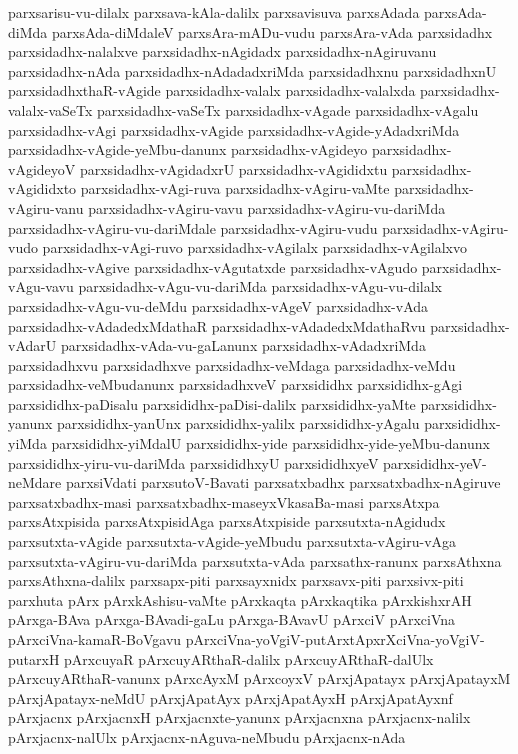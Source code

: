 {parxsarisu-vu-dilalx
parxsava-kAla-dalilx
parxsavisuva
parxsAdada
parxsAda-diMda
parxsAda-diMdaleV
parxsAra-mADu-vudu
parxsAra-vAda
parxsidadhx
parxsidadhx-nalalxve
parxsidadhx-nAgidadx
parxsidadhx-nAgiruvanu
parxsidadhx-nAda
parxsidadhx-nAdadadxriMda
parxsidadhxnu
parxsidadhxnU
parxsidadhxthaR-vAgide
parxsidadhx-valalx
parxsidadhx-valalxda
parxsidadhx-valalx-vaSeTx
parxsidadhx-vaSeTx
parxsidadhx-vAgade
parxsidadhx-vAgalu
parxsidadhx-vAgi
parxsidadhx-vAgide
parxsidadhx-vAgide-yAdadxriMda
parxsidadhx-vAgide-yeMbu-danunx
parxsidadhx-vAgideyo
parxsidadhx-vAgideyoV
parxsidadhx-vAgidadxrU
parxsidadhx-vAgididxtu
parxsidadhx-vAgididxto
parxsidadhx-vAgi-ruva
parxsidadhx-vAgiru-vaMte
parxsidadhx-vAgiru-vanu
parxsidadhx-vAgiru-vavu
parxsidadhx-vAgiru-vu-dariMda
parxsidadhx-vAgiru-vu-dariMdale
parxsidadhx-vAgiru-vudu
parxsidadhx-vAgiru-vudo
parxsidadhx-vAgi-ruvo
parxsidadhx-vAgilalx
parxsidadhx-vAgilalxvo
parxsidadhx-vAgive
parxsidadhx-vAgutatxde
parxsidadhx-vAgudo
parxsidadhx-vAgu-vavu
parxsidadhx-vAgu-vu-dariMda
parxsidadhx-vAgu-vu-dilalx
parxsidadhx-vAgu-vu-deMdu
parxsidadhx-vAgeV
parxsidadhx-vAda
parxsidadhx-vAdadedxMdathaR
parxsidadhx-vAdadedxMdathaRvu
parxsidadhx-vAdarU
parxsidadhx-vAda-vu-gaLanunx
parxsidadhx-vAdadxriMda
parxsidadhxvu
parxsidadhxve
parxsidadhx-veMdaga
parxsidadhx-veMdu
parxsidadhx-veMbudanunx
parxsidadhxveV
parxsididhx
parxsididhx-gAgi
parxsididhx-paDisalu
parxsididhx-paDisi-dalilx
parxsididhx-yaMte
parxsididhx-yanunx
parxsididhx-yanUnx
parxsididhx-yalilx
parxsididhx-yAgalu
parxsididhx-yiMda
parxsididhx-yiMdalU
parxsididhx-yide
parxsididhx-yide-yeMbu-danunx
parxsididhx-yiru-vu-dariMda
parxsididhxyU
parxsididhxyeV
parxsididhx-yeV-neMdare
parxsiVdati
parxsutoV-Bavati
parxsatxbadhx
parxsatxbadhx-nAgiruve
parxsatxbadhx-masi
parxsatxbadhx-maseyxVkasaBa-masi
parxsAtxpa
parxsAtxpisida
parxsAtxpisidAga
parxsAtxpiside
parxsutxta-nAgidudx
parxsutxta-vAgide
parxsutxta-vAgide-yeMbudu
parxsutxta-vAgiru-vAga
parxsutxta-vAgiru-vu-dariMda
parxsutxta-vAda
parxsathx-ranunx
parxsAthxna
parxsAthxna-dalilx
parxsapx-piti
parxsayxnidx
parxsavx-piti
parxsivx-piti
parxhuta
pArx
pArxkAshisu-vaMte
pArxkaqta
pArxkaqtika
pArxkishxrAH
pArxga-BAva
pArxga-BAvadi-gaLu
pArxga-BAvavU
pArxciV
pArxciVna
pArxciVna-kamaR-BoVgavu
pArxciVna-yoVgiV-putArxtApxrXciVna-yoVgiV-putarxH
pArxcuyaR
pArxcuyARthaR-dalilx
pArxcuyARthaR-dalUlx
pArxcuyARthaR-vanunx
pArxcAyxM
pArxcoyxV
pArxjApatayx
pArxjApatayxM
pArxjApatayx-neMdU
pArxjApatAyx
pArxjApatAyxH
pArxjApatAyxnf
pArxjacnx
pArxjacnxH
pArxjacnxte-yanunx
pArxjacnxna
pArxjacnx-nalilx
pArxjacnx-nalUlx
pArxjacnx-nAguva-neMbudu
pArxjacnx-nAda
}
